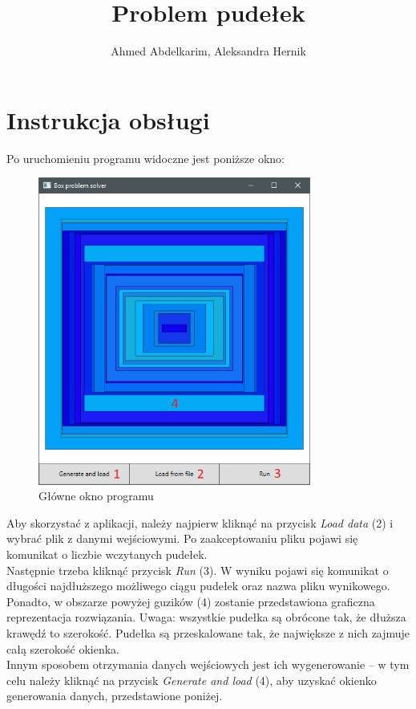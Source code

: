 \documentclass{article}
\title{Problem pudełek}
\author{Ahmed Abdelkarim, Aleksandra Hernik}
\begin{document}
\maketitle

\section{Instrukcja obsługi}
Po uruchomieniu programu widoczne jest poniższe okno:
\begin{figure}[H]
\centering
\includegraphics[width=0.8\textwidth]{instrukcja.png}
\caption{Główne okno programu}
\end{figure}
Aby skorzystać z aplikacji, należy najpierw kliknąć na przycisk \textit{Load data} (2) i wybrać plik z danymi wejściowymi. Po zaakceptowaniu pliku pojawi się komunikat o liczbie wczytanych pudełek. \\
Następnie trzeba kliknąć przycisk \textit{Run} (3). W wyniku pojawi się komunikat o długości najdłuższego możliwego ciągu pudełek oraz nazwa pliku wynikowego. Ponadto, w obszarze powyżej guzików (4) zostanie przedstawiona graficzna reprezentacja rozwiązania. Uwaga: wszystkie pudełka są obrócone tak, że dłuższa krawędź to szerokość.  Pudełka są przeskalowane tak, że największe z nich zajmuje całą szerokość okienka. \\
Innym sposobem otrzymania danych wejściowych jest ich wygenerowanie -- w tym celu należy kliknąć na przycisk \textit{Generate and load} (4), aby uzyskać okienko generowania danych, przedstawione poniżej.
\end{document}

